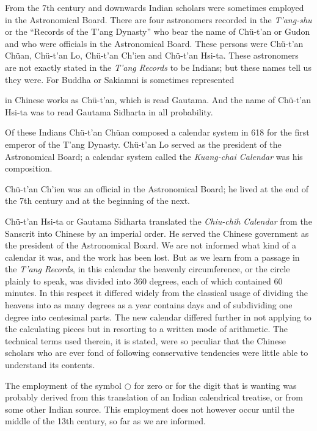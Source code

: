 \documentclass[11pt]{article}
\newcommand{\scanpage}[2]{\clearpage\setcounter{footnote}{0}\noindent{\footnotesize\color{gray}PDF page #1 · #2}\par\medskip}
\newcommand{\scanfooter}{}
\begin{document}
From the 7th century and downwards Indian scholars were sometimes employed in the Astronomical Board. There are four astronomers recorded in the \emph{T'ang-shu} or the ``Records of the T'ang Dynasty'' who bear the name of Chü-t'an or Gudon and who were officials in the Astronomical Board. These persons were Chü-t'an Chüan, Chü-t'an Lo, Chü-t'an Ch'ien and Chü-t'an Hsi-ta. These astronomers are not exactly stated in the \emph{T'ang Records} to be Indians; but these names tell us they were. For Buddha or Sakiamni is sometimes represented
\scanfooter

\scanpage{0073}{Chapter 9, printed page 59}
in Chinese works as Chü-t'an, which is read Gautama. And the name of Chü-t'an Hsi-ta was to read Gautama Sidharta in all probability.

Of these Indians Chü-t'an Chüan composed a calendar system in 618 for the first emperor of the T'ang Dynasty. Chü-t'an Lo served as the president of the Astronomical Board; a calendar system called the \emph{Kuang-chai Calendar} was his composition.

Chü-t'an Ch'ien was an official in the Astronomical Board; he lived at the end of the 7th century and at the beginning of the next.

Chü-t'an Hsi-ta or Gautama Sidharta translated the \emph{Chiu-chih Calendar} from the Sanscrit into Chinese by an imperial order. He served the Chinese government as the president of the Astronomical Board. We are not informed what kind of a calendar it was, and the work has been lost. But as we learn from a passage in the \emph{T'ang Records}, in this calendar the heavenly circumference, or the circle plainly to speak, was divided into 360 degrees, each of which contained 60 minutes. In this respect it differed widely from the classical usage of dividing the heavens into as many degrees as a year contains days and of subdividing one degree into centesimal parts. The new calendar differed further in not applying to the calculating pieces but in resorting to a written mode of arithmetic. The technical terms used therein, it is stated, were so peculiar that the Chinese scholars who are ever fond of following conservative tendencies were little able to understand its contents.

The employment of the symbol $\bigcirc$ for zero or for the digit that is wanting was probably derived from this translation of an Indian calendrical treatise, or from some other Indian source. This employment does not however occur until the middle of the 13th century, so far as we are informed.
\end{document}
